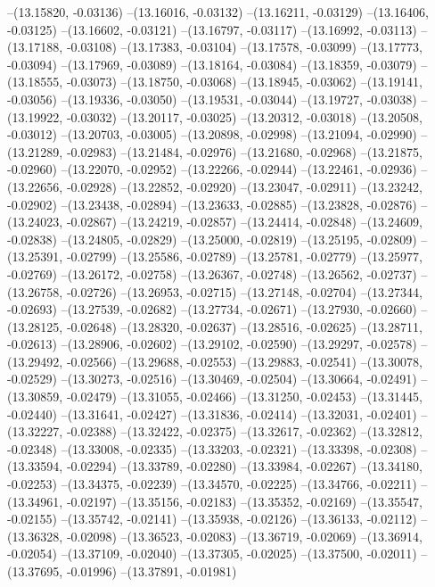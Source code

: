 --(13.15820, -0.03136)
--(13.16016, -0.03132)
--(13.16211, -0.03129)
--(13.16406, -0.03125)
--(13.16602, -0.03121)
--(13.16797, -0.03117)
--(13.16992, -0.03113)
--(13.17188, -0.03108)
--(13.17383, -0.03104)
--(13.17578, -0.03099)
--(13.17773, -0.03094)
--(13.17969, -0.03089)
--(13.18164, -0.03084)
--(13.18359, -0.03079)
--(13.18555, -0.03073)
--(13.18750, -0.03068)
--(13.18945, -0.03062)
--(13.19141, -0.03056)
--(13.19336, -0.03050)
--(13.19531, -0.03044)
--(13.19727, -0.03038)
--(13.19922, -0.03032)
--(13.20117, -0.03025)
--(13.20312, -0.03018)
--(13.20508, -0.03012)
--(13.20703, -0.03005)
--(13.20898, -0.02998)
--(13.21094, -0.02990)
--(13.21289, -0.02983)
--(13.21484, -0.02976)
--(13.21680, -0.02968)
--(13.21875, -0.02960)
--(13.22070, -0.02952)
--(13.22266, -0.02944)
--(13.22461, -0.02936)
--(13.22656, -0.02928)
--(13.22852, -0.02920)
--(13.23047, -0.02911)
--(13.23242, -0.02902)
--(13.23438, -0.02894)
--(13.23633, -0.02885)
--(13.23828, -0.02876)
--(13.24023, -0.02867)
--(13.24219, -0.02857)
--(13.24414, -0.02848)
--(13.24609, -0.02838)
--(13.24805, -0.02829)
--(13.25000, -0.02819)
--(13.25195, -0.02809)
--(13.25391, -0.02799)
--(13.25586, -0.02789)
--(13.25781, -0.02779)
--(13.25977, -0.02769)
--(13.26172, -0.02758)
--(13.26367, -0.02748)
--(13.26562, -0.02737)
--(13.26758, -0.02726)
--(13.26953, -0.02715)
--(13.27148, -0.02704)
--(13.27344, -0.02693)
--(13.27539, -0.02682)
--(13.27734, -0.02671)
--(13.27930, -0.02660)
--(13.28125, -0.02648)
--(13.28320, -0.02637)
--(13.28516, -0.02625)
--(13.28711, -0.02613)
--(13.28906, -0.02602)
--(13.29102, -0.02590)
--(13.29297, -0.02578)
--(13.29492, -0.02566)
--(13.29688, -0.02553)
--(13.29883, -0.02541)
--(13.30078, -0.02529)
--(13.30273, -0.02516)
--(13.30469, -0.02504)
--(13.30664, -0.02491)
--(13.30859, -0.02479)
--(13.31055, -0.02466)
--(13.31250, -0.02453)
--(13.31445, -0.02440)
--(13.31641, -0.02427)
--(13.31836, -0.02414)
--(13.32031, -0.02401)
--(13.32227, -0.02388)
--(13.32422, -0.02375)
--(13.32617, -0.02362)
--(13.32812, -0.02348)
--(13.33008, -0.02335)
--(13.33203, -0.02321)
--(13.33398, -0.02308)
--(13.33594, -0.02294)
--(13.33789, -0.02280)
--(13.33984, -0.02267)
--(13.34180, -0.02253)
--(13.34375, -0.02239)
--(13.34570, -0.02225)
--(13.34766, -0.02211)
--(13.34961, -0.02197)
--(13.35156, -0.02183)
--(13.35352, -0.02169)
--(13.35547, -0.02155)
--(13.35742, -0.02141)
--(13.35938, -0.02126)
--(13.36133, -0.02112)
--(13.36328, -0.02098)
--(13.36523, -0.02083)
--(13.36719, -0.02069)
--(13.36914, -0.02054)
--(13.37109, -0.02040)
--(13.37305, -0.02025)
--(13.37500, -0.02011)
--(13.37695, -0.01996)
--(13.37891, -0.01981)
